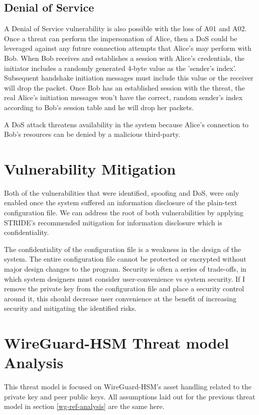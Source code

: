 \documentclass [11pt, proquest] {uwthesis}[2020/02/24]
\begin{document}
\subsection{Denial of Service}
\label{dos}
A Denial of Service vulnerability is also possible with the loss of A01 and A02. Once a threat can perform the impersonation of Alice, then a DoS could be leveraged against any future connection attempts that Alice's may perform with Bob. When Bob receives and establishes a session with Alice's credentials, the initiator includes a randomly generated 4-byte value as the 'sender's index'. Subsequent handshake initiation messages must include this value or the receiver will drop the packet. Once Bob has an established session with the threat, the real Alice's initiation messages won't have the correct, random sender's index according to Bob's session table and he will drop her packets.

A DoS attack threatens availability in the system because Alice's connection to Bob's resources can be denied by a malicious third-party.

\section{Vulnerability Mitigation}
\label{vulns}
Both of the vulnerabilities that were identified, spoofing and DoS, were only enabled once the system suffered an information disclosure of the plain-text configuration file. We can address the root of both vulnerabilities by applying STRIDE's recommended mitigation for information disclosure which is confidentiality. 

The confidentiality of the configuration file is a weakness in the design of the system. The entire configuration file cannot be protected or encrypted without major design changes to the program.
Security is often a series of trade-offs, in which system designers must consider user-convenience vs system security. If I remove the private key from the configuration file and place a security control around it, this should decrease user convenience at the benefit of increasing security and mitigating the identified risks.

\section{WireGuard-HSM Threat model Analysis}
\label{wg-hsm-analysis}
This threat model is focused on WireGuard-HSM's asset handling related to the private key and peer public keys. All assumptions laid out for the previous threat model in section \ref{wg-ref-analysis} are the same here.
\end{document}

